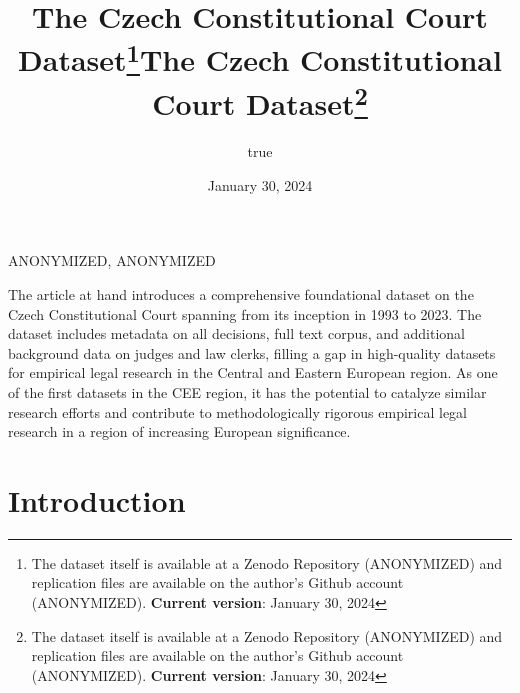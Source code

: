 \documentclass[
  11pt,
]{article}
\title{The Czech Constitutional Court Dataset\thanks{The dataset itself
is available at a Zenodo Repository (ANONYMIZED) and replication files
are available on the author's Github account (ANONYMIZED).
\textbf{Current version}: January 30, 2024}}
\author{true}
\date{January 30, 2024}
\title{The Czech Constitutional Court Dataset\thanks{The dataset itself
is available at a Zenodo Repository (ANONYMIZED) and replication files
are available on the author's Github account (ANONYMIZED).
\textbf{Current version}: January 30, 2024}  }
\date{}
\renewenvironment{abstract}
 {{%
    \setlength{\leftmargin}{0mm}
    \setlength{\rightmargin}{\leftmargin}%
  }%
  \relax}
 {\endlist}
\begin{document}



{%
\setlength{\parindent}{0pt}
\thispagestyle{plain}
{%
\maketitle  %

}




{
   \vskip 13.5pt\relax \normalsize\fontsize{11}{12}
   \MakeUppercase{ANONYMIZED}, \small{ANONYMIZED}   

}

}








\begin{abstract}


    \vskip 8.5pt %

\noindent \small{The article at hand introduces a comprehensive
foundational dataset on the Czech Constitutional Court spanning from its
inception in 1993 to 2023. The dataset includes metadata on all
decisions, full text corpus, and additional background data on judges
and law clerks, filling a gap in high-quality datasets for empirical
legal research in the Central and Eastern European region. As one of the
first datasets in the CEE region, it has the potential to catalyze
similar research efforts and contribute to methodologically rigorous
empirical legal research in a region of increasing European
significance.}




\end{abstract}


\vskip -8.5pt




\setlength{\parindent}{16pt}
\setlength{\parskip}{0pt}

\hypertarget{introduction}{%
\section{Introduction}\label{introduction}}
\end{document}
